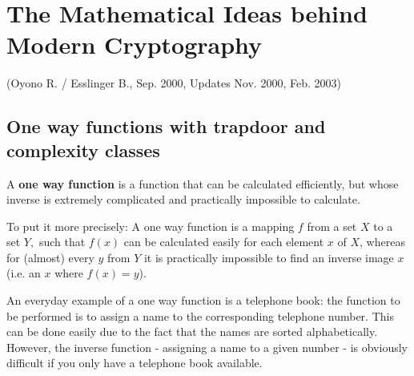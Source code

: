 

\setlength{\fboxrule}{.4pt}
\setlength{\fboxsep}{4pt}

\newpage
\section{The Mathematical Ideas behind Modern Cryptography}
\label{Chapter_ModernCryptography}
\hypertarget{Chapter_ModernCryptography}{}
(Oyono R. / Esslinger B., Sep. 2000, Updates Nov. 2000, Feb. 2003)

\subsection{One way functions with trapdoor and complexity classes}
  \hypertarget{OneWayFunktion1}{}
A {\bf one way function} is a function that can be calculated 
efficiently, but whose inverse is extremely complicated and practically 
impossible to calculate.\par

To put it more precisely:  A one way function is a mapping $ f $ from a set $ X 
$ to a set $ Y, $ such that $ f(x) $ can be calculated easily for each element $ 
x $ of $ X $, whereas for (almost) every $ y $ from $ Y $  it is practically 
impossible to find an inverse image $ x $ (i.e. an $ x $ where $ f(x)=y $).\par

An everyday example of a one way function is a telephone book: the function to 
be performed is to assign a name to the corresponding telephone number. This can 
be done easily due to the fact that the names are sorted alphabetically. 
However, the inverse function - assigning a name to a given number - is 
obviously difficult if you only have a telephone book available. \par

